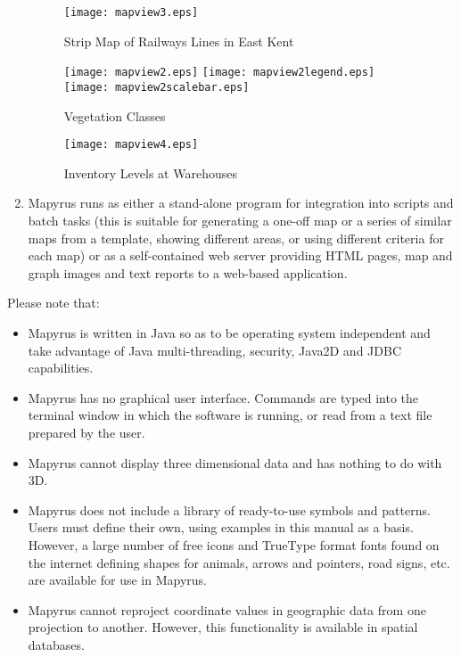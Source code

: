 \begin{enumerate}
\begin{figure}
\texttt{[image: mapview3.eps]}
\caption{Strip Map of Railways Lines in East Kent}
\label{mapview3}
\end{figure}

\begin{figure}
\texttt{[image: mapview2.eps]}
\texttt{[image: mapview2legend.eps]}
\vspace{1pt}
\texttt{[image: mapview2scalebar.eps]}
\caption{Vegetation Classes}
\label{mapview2}
\end{figure}

\begin{figure}
\texttt{[image: mapview4.eps]}
\caption{Inventory Levels at Warehouses}
\label{mapview4}
\end{figure}

\item
Mapyrus runs as either
a stand-alone program for integration into
scripts and batch tasks  (this is suitable for generating a one-off
map or a series of similar maps from a template,
showing different areas, or using different criteria for each map)
or as a self-contained web server providing HTML pages, map and
graph images and text reports to a web-based application.

\end{enumerate}

Please note that:

\begin{itemize}
\item
Mapyrus is written in Java so as to be operating system independent
and take advantage of Java multi-threading, security,
Java2D and JDBC capabilities.

\item
Mapyrus has no graphical user interface.
Commands are typed into the terminal window in which the software is running,
or read from a text file prepared by the user.

\item
Mapyrus cannot display three dimensional data and has nothing to do
with 3D.

\item
Mapyrus does not include a library of ready-to-use symbols and patterns.
Users must define their own, using examples in this manual as a basis.
However, a large number of free icons
and TrueType format fonts found on the internet
defining shapes for animals, arrows and pointers, road signs, etc. are
available for use in Mapyrus.

\item
Mapyrus cannot reproject coordinate values in geographic data from
one projection to another.  However, this functionality
is available in spatial databases.
\end{itemize}

